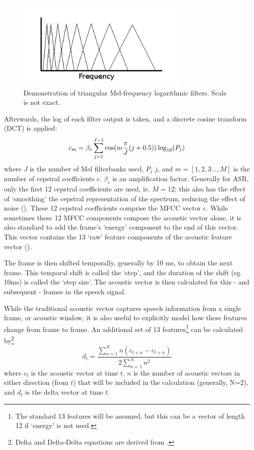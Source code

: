 \begin{figure}[h]
\centering
\includegraphics[width=0.75\textwidth]{figure/filt-mfcc.png}
\caption{Demonstration of triangular Mel-frequency logarithmic filters. Scale is not exact.}\label{fig:filt-mfcc}
\end{figure}

Afterwards, the log of each filter output is taken, and a discrete cosine transform (DCT) is applied: \begin{equation} \label{eq:mfcc-calculation}  c_m = \beta_c \sum_{j=1}^{J-1} \cos(m\dfrac{\pi}{J} (j+0.5)) \log_{10} (P_j) \end{equation} where $J$ is the number of Mel filterbanks used, $P_j$ \DIFdelbegin {}\DIFdelend \DIFaddbegin {}\DIFaddend $j$\DIFdelbegin {}\DIFdelend , and $m=[1,2,3...,M]$ is the number of cepstral coefficients $c$.  $\beta_c$ is an amplification factor.  Generally for ASR, only the first 12 cepstral coefficients are used, ie. $M=12$; this also has the effect of `smoothing' the cepstral representation of the spectrum, reducing the effect of noise (\cite{gold:11}).  These 12 cepstral coefficients comprise the MFCC vector $c$.  While sometimes these 12 MFCC components compose the acoustic vector alone, it is also standard to add the frame's `energy' component to the end of this vector.  This vector contains the 13 `raw' feature components of the acoustic feature vector (\cite{jurafsky:09}).  

The frame is then shifted temporally, generally by 10 ms, to obtain the next frame. This temporal shift is called the `step', and the duration of the shift (eg. 10ms) is called the `step size'.  The acoustic vector is then calculated for this - and subsequent - frames in the speech signal.

While the traditional acoustic vector captures speech information from a single frame, or acoustic window, it is also useful to explicitly model how these features change from frame to frame.  An additional set of 13 features\footnote{The standard 13 features will be assumed, but this can be a vector of length 12 if `energy' is not used.} can be calculated by\footnote{Delta and Delta-Delta equations are derived from \cite{gold:11}.} \begin{equation} d_t = \dfrac{\sum_{n=1}^{N} n(c_{t+n} - c_{t+n})}{2\sum_{n=1}^{N} n^2} \end{equation} where $c_t$ is the acoustic vector at time $t$, $n$ is the number of acoustic vectors in either direction (from $t$) that will be included in the calculation (generally, N=2), and $d_t$ is the delta vector at time $t$.  

